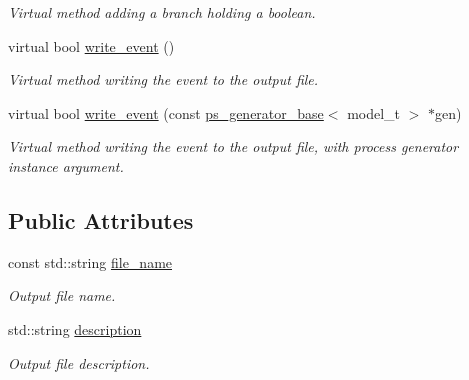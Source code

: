 \begin{DoxyCompactItemize}
\begin{DoxyCompactList}\small\item\em Virtual method adding a branch holding a boolean. \end{DoxyCompactList}\item 
\hypertarget{a00315_a75ec56db0587a4d62a8831cdb80248a5}{virtual bool \hyperlink{a00315_a75ec56db0587a4d62a8831cdb80248a5}{write\-\_\-event} ()}\label{a00315_a75ec56db0587a4d62a8831cdb80248a5}

\begin{DoxyCompactList}\small\item\em Virtual method writing the event to the output file. \end{DoxyCompactList}\item 
virtual bool \hyperlink{a00315_ac94d8fdd89e311ce7fef48a3eacc2dc5}{write\-\_\-event} (const \hyperlink{a00442}{ps\-\_\-generator\-\_\-base}$<$ model\-\_\-t $>$ $\ast$gen)
\begin{DoxyCompactList}\small\item\em Virtual method writing the event to the output file, with process generator instance argument. \end{DoxyCompactList}\end{DoxyCompactItemize}
\subsection*{Public Attributes}
\begin{DoxyCompactItemize}
\item 
\hypertarget{a00315_adcc7d26eacb87b67d0c4b160fffeacd4}{const std\-::string \hyperlink{a00315_adcc7d26eacb87b67d0c4b160fffeacd4}{file\-\_\-name}}\label{a00315_adcc7d26eacb87b67d0c4b160fffeacd4}

\begin{DoxyCompactList}\small\item\em Output file name. \end{DoxyCompactList}\item 
\hypertarget{a00315_a366c2b2cfaa58182e2feebc1c30ce94c}{std\-::string \hyperlink{a00315_a366c2b2cfaa58182e2feebc1c30ce94c}{description}}\label{a00315_a366c2b2cfaa58182e2feebc1c30ce94c}

\begin{DoxyCompactList}\small\item\em Output file description. \end{DoxyCompactList}\end{DoxyCompactItemize}


